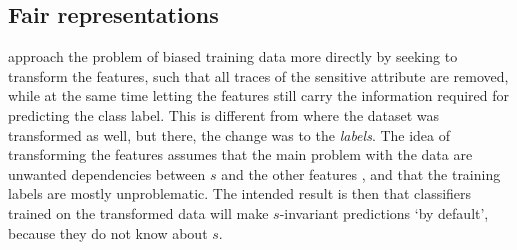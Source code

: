 \subsection{Fair representations}\label{sec:fair-representation} \citet{zemel2013learning} approach
the problem of biased training data more directly by seeking to transform the features, such that
all traces of the sensitive attribute are removed, while at the same time letting the features
still carry the information required for predicting the class label.
This is different from \citet{kamiran2009classifying} where the dataset was transformed as well,
but there, the change was to the \emph{labels}. The idea of transforming the features assumes that
the main problem with the data are unwanted dependencies between $s$ and the other features
\citep[called \emph{latent prejudice} in ][]{kamishima2012fairness}, and that the training labels
are mostly unproblematic. The intended result is then that classifiers trained on the transformed
data will make $s$-invariant predictions `by default', because they do not know about $s$.

